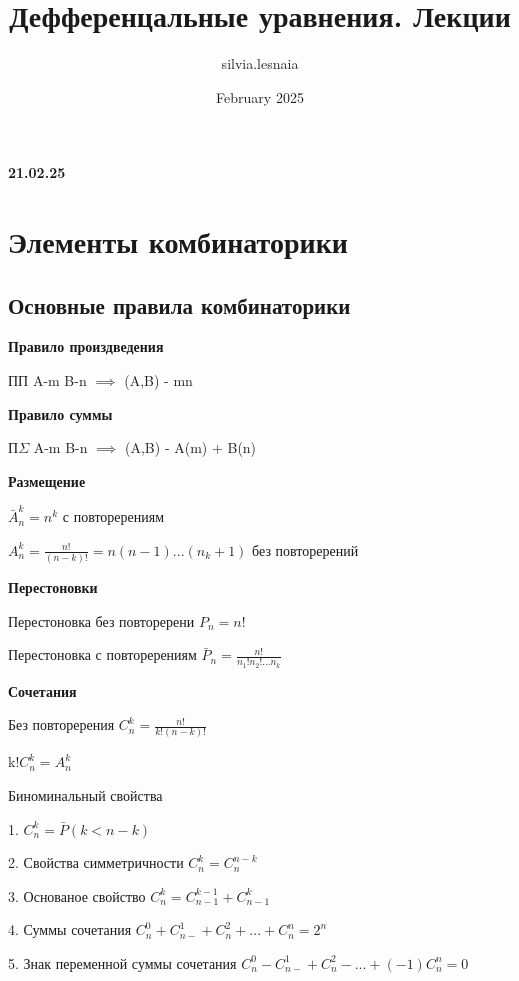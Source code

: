 \documentclass{article}
\title{Дефференцальные уравнения. Лекции}
\author{silvia.lesnaia }
\date{February 2025}
\begin{document}
\maketitle

\textbf{21.02.25}

\section{Элементы комбинаторики}

\subsection{Основные правила комбинаторики}


\textbf{Правило произдведения}

ПП A-m B-n $\implies$ (A,B) - mn

\textbf{Правило суммы}

П$\Sigma$ A-m B-n $\implies$ (A,B) - A(m) + B(n)
\vspace{5mm}

\textbf{Размещение} 

$\bar{A}_{n}^{k} = n^k$ с повторерениям

$A_{n}^{k} = \frac{n!}{(n-k)!} = n(n-1)... (n_k+1)$ без повторерений


\vspace{5mm}
\textbf{Перестоновки} 

Перестоновка без повторерени $P_n=n!$

Перестоновка с повторерениям $\bar{P}_n = \frac{n!}{n_1!n_2!...n_k}$


\vspace{5mm}
\textbf{Сочетания}

Без повторерения $C_{n}^{k} = \frac{n!}{k!(n-k)!}$

k!$C_{n}^{k}=A_{n}^{k}$

\vspace{1cm}

Биноминальный свойства 

1. $C_{n}^{k} = \bar{P}(k<n-k)$

2. Свойства симметричности $C_{n}^{k} = C_{n}^{n-k}$

3. Основаное свойство  $C_{n}^{k} = C_{n-1}^{k-1} + C_{n-1}^{k}$

4. Суммы сочетания  $C_{n}^{0} + C_{n-}^{1} + C_{n}^{2}+...+C_{n}^{n}=2^n$

5. Знак переменной суммы сочетания 
$C_{n}^{0} - C_{n-}^{1} + C_{n}^{2}-...+(-1)C_{n}^{n} = 0$
\end{document}
